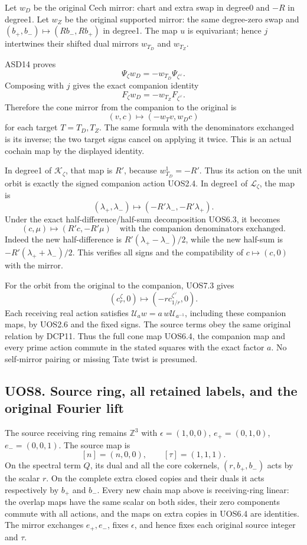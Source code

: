 Let \(w_D\) be the original Cech mirror: chart and extra swap in degree0
and \(-R\) in degree1. Let \(w_Z\) be the original supported mirror: the
same degree-zero swap and \((b_+,b_-)\mapsto(Rb_-,Rb_+)\) in degree1.
The map \(u\) is equivariant; hence \(j\) intertwines their shifted dual
mirrors \(w_{T_D}\) and \(w_{T_Z}\).

ASD14 proves \[
 \Psi_\zeta w_D=-w_{T_D}\Psi_{\zeta^\vee}.
\] Composing with \(j\) gives the exact companion identity \[
 F_\zeta w_D=-w_{T_Z}F_{\zeta^\vee}.
 \tag{UOS7.1}
\] Therefore the cone mirror from the companion to the original is \[
 (v,c)\longmapsto(-w_Tv,w_Dc)
\] for each target \(T=T_D,T_Z\). The same formula with the denominators
exchanged is its inverse; the two target signs cancel on applying it
twice. This is an actual cochain map by the displayed identity.

In degree1 of \(\mathcal K_\zeta\), that map is \(R'\), because
\(w_{T_D}^1=-R'\). Thus its action on the unit orbit is exactly the
signed companion action UOS2.4. In degree1 of \(\mathcal L_\zeta\), the
map is \[
 (\lambda_+,\lambda_-)
 \longmapsto(-R'\lambda_-,-R'\lambda_+).
 \tag{UOS7.2}
\] Under the exact half-difference/half-sum decomposition UOS6.3, it
becomes \[
 (c,\mu)\longmapsto(R'c,-R'\mu)
 \quad\text{with the companion denominators exchanged}.
 \tag{UOS7.3}
\] Indeed the new half-difference is \(R'(\lambda_+-\lambda_-)/2\),
while the new half-sum is \(-R'(\lambda_++\lambda_-)/2\). This verifies
all signs and the compatibility of \(c\mapsto(c,0)\) with the mirror.

For the orbit from the original to the companion, UOS7.3 gives \[
 (c_r^\zeta,0)\longmapsto(-r c_{1/r}^{\zeta^\vee},0).
 \tag{UOS7.4}
\] Each receiving real action satisfies
\(\mathcal U_a w=a\,w\mathcal U_{a^{-1}}\), including these companion
maps, by UOS2.6 and the fixed signs. The source terms obey the same
original relation by DCP11. Thus the full cone map UOS6.4, the companion
map and every prime action commute in the stated squares with the exact
factor \(a\). No self-mirror pairing or missing Tate twist is presumed.

\subsection{UOS8. Source ring, all retained labels, and the original
Fourier
lift}\label{uos8.-source-ring-all-retained-labels-and-the-original-fourier-lift}

The source receiving ring remains \(\mathbb Z^3\) with
\(\epsilon=(1,0,0)\), \(e_+=(0,1,0)\), \(e_-=(0,0,1)\). The source map
is \[
 [n]=(n,0,0),\qquad[\tau]=(1,1,1).
\] On the spectral term \(Q\), its dual and all the core cokernels,
\((r,b_+,b_-)\) acts by the scalar \(r\). On the complete extra closed
copies and their duals it acts respectively by \(b_+\) and \(b_-\).
Every new chain map above is receiving-ring linear: the overlap maps
have the same scalar on both sides, their zero components commute with
all actions, and the maps on extra copies in UOS6.4 are identities. The
mirror exchanges \(e_+,e_-\), fixes \(\epsilon\), and hence fixes each
original source integer and \(\tau\).

